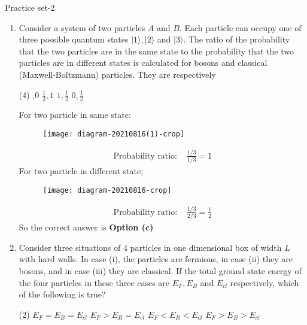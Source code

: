 \newpage
\begin{abox}
	Practice set-2
\end{abox}
\begin{enumerate}
	\item Consider a system of two particles $A$ and $B$. Each particle can occupy one of three possible quantum states $|1\rangle,|2\rangle$ and $|3\rangle$. The ratio of the probability that the two particles
	are in the same state to the probability that the two particles are in different states is calculated for bosons and classical (Maxwell-Boltzmann) particles. They are respectively
	{}
	
	\begin{tasks}(4)
		,0
		\task[\textbf{b.}]  $\frac{1}{2}, 1$
		\task[\textbf{c.}] $1, \frac{1}{2}$
		\task[\textbf{d.}] $0, \frac{1}{2}$
	\end{tasks}
	\begin{answer}
		For two particle in same state:\\
		\begin{figure}[H]
			\centering
			\texttt{[image: diagram-20210816(1)-crop]}
		\end{figure}
		\begin{align*}
		\text{Probability ratio: }&\frac{1 / 3}{1 / 3}=1
		\end{align*}
		For two particle in different state;
		\begin{figure}[H]
			\centering
			\texttt{[image: diagram-20210816-crop]}
		\end{figure}
		\begin{align*}
		\text{Probability ratio: }&\frac{1 / 3}{2 / 3}=\frac{1}{2}
		\end{align*}
		So the correct answer is \textbf{Option (c)}
	\end{answer}
	\item Consider three situations of 4 particles in one dimensional box of width $L$ with hard walls. In case (i), the particles are fermions, in case (ii) they are bosons, and in case (iii) they are classical. If the total ground state energy of the four particles in these three cases are $E_{F}, E_{B}$ and $E_{c l}$ respectively, which of the following is true?
	{}
	\begin{tasks}(2)
		\task[\textbf{a.}] $E_{F}=E_{B}=E_{c l}$
		\task[\textbf{b.}] $E_{F}>E_{B}=E_{c l}$
		\task[\textbf{c.}] $E_{F}<E_{B}<E_{c l}$
		\task[\textbf{d.}] $E_{F}>E_{B}>E_{c l}$
	\end{tasks}

\end{enumerate}
